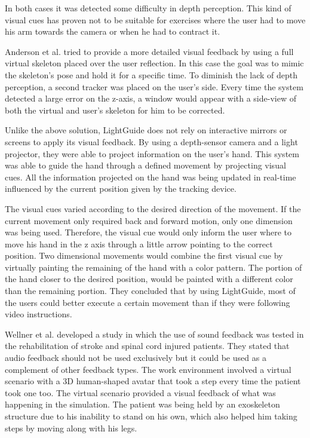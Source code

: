 \documentclass[runningheads]{llncs}
\begin{document}
In both cases it was detected some difficulty in depth perception. 
This kind of visual cues has proven not to be suitable for exercises 
where the user had to move his arm towards the camera or when he had to contract it.

Anderson et al. \cite{Anderson} tried to provide a more detailed visual feedback 
by using a full virtual skeleton placed over the user reflection. In this case the goal 
was to mimic the skeleton's pose and hold it for a specific time.
To diminish the lack of depth perception, a second tracker was placed on the user's side. 
Every time the system detected a large error on the z-axis, a window would appear with a 
side-view of both the virtual and user's skeleton for him to be corrected.

Unlike the above solution, LightGuide \cite{Sodhi2012} does not rely on interactive mirrors or screens to 
apply its visual feedback. By using a depth-sensor camera and a light projector, they were able 
to project information on the user's hand. This system was able to guide the hand through a defined 
movement by projecting visual cues. All the information projected on 
the hand was being updated in real-time influenced by the current position given by the tracking device.

The visual cues varied according to the desired direction of the movement. 
If the current movement only required back and forward motion, only one dimension was being used. 
Therefore, the visual cue would only inform the user where to move his 
hand in the z axis through a little arrow pointing to the correct position.
Two dimensional movements would combine the first visual cue by virtually painting the
remaining of the hand with a color pattern. The portion of the hand closer to the
desired position, would be painted with a different color than the remaining portion.
They concluded that by using LightGuide, most of the users could better execute a certain 
movement than if they were following video instructions.

Wellner et al. \cite{Wellner2007a} developed a study in which the use of sound feedback was tested in the rehabilitation
of stroke and spinal cord injured patients. They stated that audio feedback should not be used exclusively but it 
could be used as a complement of other feedback types.
The work environment involved a virtual scenario with a 3D human-shaped avatar that took a step every time the
patient took one too. The virtual scenario provided a visual feedback of what was happening in the simulation.
The patient was being held by an exoskeleton structure due to his inability to stand on his 
own, which also helped him taking steps by moving along with his legs. 
\end{document}
